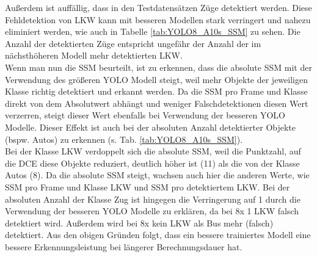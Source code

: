{{		Außerdem ist auffällig, dass in den Testdatensätzen Züge detektiert werden. Diese Fehldetektion von LKW kann mit besseren Modellen stark verringert und nahezu eliminiert werden, wie auch in Tabelle \ref{tab:YOLO8_A10s_SSM} zu sehen. Die Anzahl der detektierten Züge entspricht ungefähr der Anzahl der im nächsthöheren Modell mehr detektierten LKW. \\

		Wenn man nun die SSM beurteilt, ist zu erkennen, dass die absolute SSM mit der Verwendung des größeren YOLO Modell steigt, weil mehr Objekte der jeweiligen Klasse richtig detektiert und erkannt werden. Da die SSM pro Frame und Klasse direkt von dem Absolutwert abhängt und weniger Falschdetektionen diesen Wert verzerren, steigt dieser Wert ebenfalls bei Verwendung der besseren YOLO Modelle. Dieser Effekt ist auch bei der absoluten Anzahl detektierter Objekte (bspw. Autos) zu erkennen (s. Tab. \ref{tab:YOLO8_A10s_SSM}). \\
		Bei der Klasse LKW verdoppelt sich die absolute SSM, weil die Punktzahl, auf die DCE diese Objekte reduziert, deutlich höher ist (11) als die von der Klasse Autos (8). Da die absolute SSM steigt, wachsen auch hier die anderen Werte, wie SSM pro Frame und Klasse LKW und SSM pro detektiertem LKW. Bei der absoluten Anzahl der Klasse Zug ist hingegen die Verringerung auf 1 durch die Verwendung der besseren YOLO Modelle zu erklären, da bei 8x 1 LKW falsch detektiert wird. Außerdem wird bei 8x kein LKW als Bus mehr (falsch) detektiert. 
		Aus den obigen Gründen folgt, dass ein bessere trainiertes Modell eine bessere Erkennungsleistung bei längerer Berechnungsdauer hat.  \\

}}
